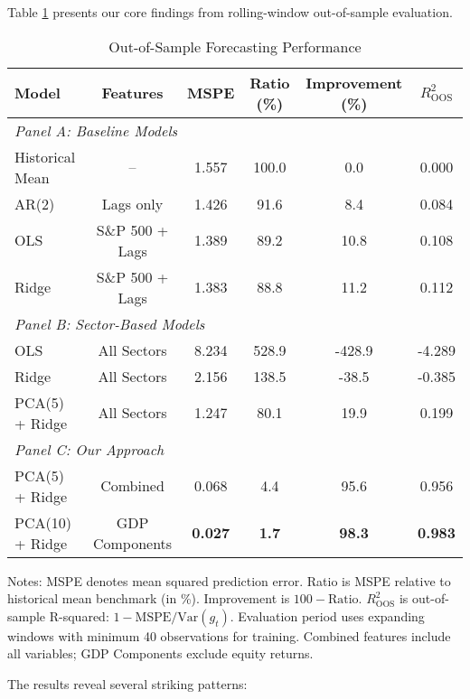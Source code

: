 \documentclass[11pt,letterpaper]{article}
\theoremstyle{plain}
\theoremstyle{definition}
\theoremstyle{remark}
\begin{document}
Table \ref{tab:main_results} presents our core findings from rolling-window out-of-sample evaluation.

\begin{table}[htbp]
\centering
\caption{Out-of-Sample Forecasting Performance}
\label{tab:main_results}
\begin{threeparttable}
\begin{tabular}{lccccc}
\toprule
Model & Features & MSPE & Ratio (\%) & Improvement (\%) & $R^2_{\text{OOS}}$ \\
\midrule
\multicolumn{6}{l}{\textit{Panel A: Baseline Models}} \\
Historical Mean & -- & 1.557 & 100.0 & 0.0 & 0.000 \\
AR(2) & Lags only & 1.426 & 91.6 & 8.4 & 0.084 \\
OLS & S\&P 500 + Lags & 1.389 & 89.2 & 10.8 & 0.108 \\
Ridge & S\&P 500 + Lags & 1.383 & 88.8 & 11.2 & 0.112 \\
\midrule
\multicolumn{6}{l}{\textit{Panel B: Sector-Based Models}} \\
OLS & All Sectors & 8.234 & 528.9 & -428.9 & -4.289 \\
Ridge & All Sectors & 2.156 & 138.5 & -38.5 & -0.385 \\
PCA(5) + Ridge & All Sectors & 1.247 & 80.1 & 19.9 & 0.199 \\
\midrule
\multicolumn{6}{l}{\textit{Panel C: Our Approach}} \\
PCA(5) + Ridge & Combined & 0.068 & 4.4 & 95.6 & 0.956 \\
PCA(10) + Ridge & GDP Components & \textbf{0.027} & \textbf{1.7} & \textbf{98.3} & \textbf{0.983} \\
\bottomrule
\end{tabular}
\begin{tablenotes}
\small
\item Notes: MSPE denotes mean squared prediction error. Ratio is MSPE relative to historical mean benchmark (in \%). Improvement is $100 - \text{Ratio}$. $R^2_{\text{OOS}}$ is out-of-sample R-squared: $1 - \text{MSPE}/\text{Var}(g_t)$. Evaluation period uses expanding windows with minimum 40 observations for training. Combined features include all variables; GDP Components exclude equity returns.
\end{tablenotes}
\end{threeparttable}
\end{table}

The results reveal several striking patterns:
\end{document}

